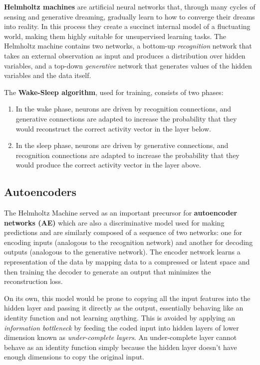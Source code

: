 \documentclass{article}
\begin{document}
\textbf{Helmholtz machines} are artificial neural networks that, through many cycles of sensing and generative dreaming, gradually learn to how to converge their dreams into reality. In this process they create a succinct internal model of a fluctuating world, making them highly suitable for unsupervised learning tasks. The Helmholtz machine contains two networks, a bottom-up \textit{recognition} network that takes an external observation as input and produces a distribution over hidden variables, and a top-down \textit{generative} network that generates values of the hidden variables and the data itself. 

The \textbf{Wake-Sleep algorithm}, used for training, consists of two phases:
\begin{enumerate}
    \item In the wake phase, neurons are driven by recognition connections, and generative connections are adapted to increase the probability that they would reconstruct the correct activity vector in the layer below.
    
    \item In the sleep phase, neurons are driven by generative connections, and recognition connections are adapted to increase the probability that they would produce the correct activity vector in the layer above.
\end{enumerate}

\subsection{Autoencoders}
The Helmholtz Machine served as an important precursor for \textbf{autoencoder networks (AE)} which are also a discriminative model used for making predictions and are similarly composed of a sequence of two networks: one for encoding inputs (analogous to the recognition network) and another for decoding outputs (analogous to the generative network). The encoder network learns a representation of the data by mapping data to a compressed or latent space and then training the decoder to generate an output that minimizes the reconstruction loss. 

On its own, this model would be prone to copying all the input features into the hidden layer and passing it directly as the output, essentially behaving like an identity function and not learning anything. This is avoided by applying an \textit{information bottleneck} by feeding the coded input into hidden layers of lower dimension known as \textit{under-complete layers}. An under-complete layer cannot behave as an identity function simply because the hidden layer doesn't have enough dimensions to copy the original input. 
\end{document}
